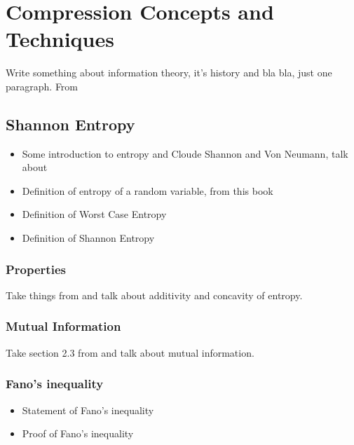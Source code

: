 
\chapter{Compression Concepts and Techniques} %

\label{ch:Chapter2} %

Write something about information theory, it's history and bla bla, just one paragraph. From \cite{han2002mathematics,ElementsofInformationTheory}

\section{Shannon Entropy}
\begin{itemize}
    \item Some introduction to entropy and Cloude Shannon and Von Neumann, talk about \cite{Shannon1948}
    \item Definition of entropy of a random variable, from this book \cite{han2002mathematics}
    \item Definition of Worst Case Entropy \cite{navarro2016compact}
    \item Definition of Shannon Entropy \cite{navarro2016compact}
\end{itemize}

\subsection{Properties}
Take things from \cite{han2002mathematics} and talk about additivity and concavity of entropy.

\subsection{Mutual Information}
Take section 2.3 from \cite{han2002mathematics} and talk about mutual information.

\subsection{Fano's inequality}
\begin{itemize}
    \item Statement of Fano's inequality \cite{ElementsofInformationTheory}
    \item Proof of Fano's inequality \cite{ElementsofInformationTheory}
\end{itemize}

